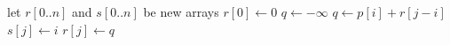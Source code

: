 \begin{algorithmic}
\State let $r[0..n]$ and $s[0..n]$ be new arrays
\State $r[0] \gets 0$
    \State $q \gets -\infty$
            \State $q \gets p[i] + r[j-i]$
            \State $s[j] \gets i$
        \EndIf
    \EndFor
    \State $r[j] \gets q$
\EndFor
\State {}
\EndFunction
\end{algorithmic}